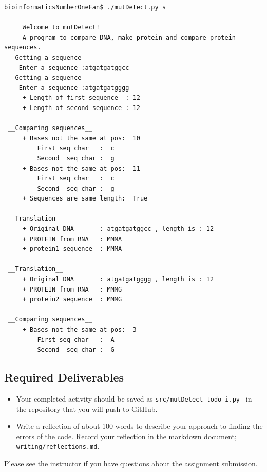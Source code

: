 \begin{verbatim}
bioinformaticsNumberOneFan$ ./mutDetect.py s

	 Welcome to mutDetect!
	 A program to compare DNA, make protein and compare protein sequences.
 __Getting a sequence__
	Enter a sequence :atgatgatggcc
 __Getting a sequence__
	Enter a sequence :atgatgatgggg
	 + Length of first sequence  : 12
	 + Length of second sequence : 12

 __Comparing sequences__
	 + Bases not the same at pos:  10
		 First seq char   :  c
		 Second  seq char :  g
	 + Bases not the same at pos:  11
		 First seq char   :  c
		 Second  seq char :  g
	 + Sequences are same length:  True

 __Translation__
	 + Original DNA       : atgatgatggcc , length is : 12
	 + PROTEIN from RNA   : MMMA
	 + protein1 sequence  : MMMA

 __Translation__
	 + Original DNA       : atgatgatgggg , length is : 12
	 + PROTEIN from RNA   : MMMG
	 + protein2 sequence  : MMMG

 __Comparing sequences__
	 + Bases not the same at pos:  3
		 First seq char   :  A
		 Second  seq char :  G

\end{verbatim}




\vspace*{-.2in}
\subsection*{Required Deliverables}
\vspace*{-.1in}

\begin{itemize}
	\item Your completed activity should be saved as {\color{red} \tt src/mutDetect\_todo\_i.py \color{black}} in the repository that you will push to GitHub.


    \item Write a reflection of about 100 words to describe your approach to finding the errors of the code. Record your reflection in the markdown document; {\tt \color{red} writing/reflections.md\color{black}}.	
	\end{itemize}

\noindent Please see the instructor if you have questions about the assignment submission.




